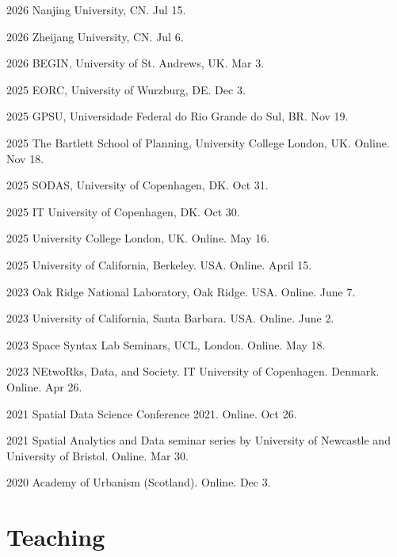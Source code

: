 \documentclass[12pt,a4paper]{report}
\begin{document}
    \begin{tablist}

        \item[2026] \tab{}Nanjing University, CN. Jul 15.  
        \item[2026] \tab{}Zheijang University, CN. Jul 6.
        \item[2026] \tab{}BEGIN, University of St. Andrews, UK. Mar 3.
        \item[2025] \tab{}EORC, University of Wurzburg, DE. Dec 3.
        \item[2025] \tab{}GPSU, Universidade Federal do Rio Grande do Sul, BR. Nov 19.
        \item[2025] \tab{}The Bartlett School of Planning, University College London, UK. Online. Nov 18.
        \item[2025] \tab{}SODAS, University of Copenhagen, DK. Oct 31.
        \item[2025] \tab{}IT University of Copenhagen, DK. Oct 30.
        \item[2025] \tab{}University College London, UK. Online. May 16.
        \item[2025] \tab{}University of California, Berkeley. USA. Online. April 15.
        \item[2023] \tab{}Oak Ridge National Laboratory, Oak Ridge. USA. Online. June 7.
        \item[2023] \tab{}University of California, Santa Barbara. USA. Online. June 2.
        \item[2023] \tab{}Space Syntax Lab Seminars, UCL, London. Online. May 18.
        \item[2023] \tab{}NEtwoRks, Data, and Society. IT University of Copenhagen. Denmark. Online. Apr 26.
        \item[2021] \tab{}Spatial Data Science Conference 2021. Online. Oct 26.
        \item[2021] \tab{}Spatial Analytics and Data seminar series by University of Newcastle and University of Bristol. Online. Mar 30.
        \item[2020] \tab{}Academy of Urbanism (Scotland). Online. Dec 3.

    \end{tablist}

    \section*{Teaching}
\end{document}
